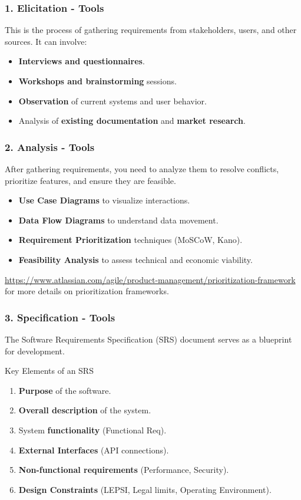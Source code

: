 \documentclass[xcolor=table]{beamer}
\begin{document}
\begin{frame}
    \frametitle{1. Elicitation - Tools}
    This is the process of gathering requirements from stakeholders, users, and other sources. It can involve:
    \begin{itemize}
        \item \textbf{Interviews and questionnaires}.
        \item \textbf{Workshops and brainstorming} sessions.
        \item \textbf{Observation} of current systems and user behavior.
        \item Analysis of \textbf{existing documentation} and \textbf{market research}.
    \end{itemize}
\end{frame}

\begin{frame}
    \frametitle{2. Analysis - Tools}
    After gathering requirements, you need to analyze them to resolve conflicts, prioritize features, and ensure they are feasible.
    \begin{itemize}
        \item \textbf{Use Case Diagrams} to visualize interactions.
        \item \textbf{Data Flow Diagrams} to understand data movement.
        \item \textbf{Requirement Prioritization} techniques (MoSCoW, Kano).
        \item \textbf{Feasibility Analysis} to assess technical and economic viability.
    \end{itemize}

    \vspace{0.5cm}
    \footnotesize \url{https://www.atlassian.com/agile/product-management/prioritization-framework} for more details on prioritization frameworks.
\end{frame}

\begin{frame}
    \frametitle{3. Specification - Tools}
    The Software Requirements Specification (SRS) document serves as a blueprint for development.
    \begin{block}{Key Elements of an SRS}
        \begin{enumerate}
            \item \textbf{Purpose} of the software.
            \item \textbf{Overall description} of the system.
            \item System \textbf{functionality} (Functional Req).
            \item \textbf{External Interfaces} (API connections).
            \item \textbf{Non-functional requirements} (Performance, Security).
            \item \textbf{Design Constraints} (LEPSI, Legal limits, Operating Environment).
        \end{enumerate}
    \end{block}
\end{frame}
\end{document}
